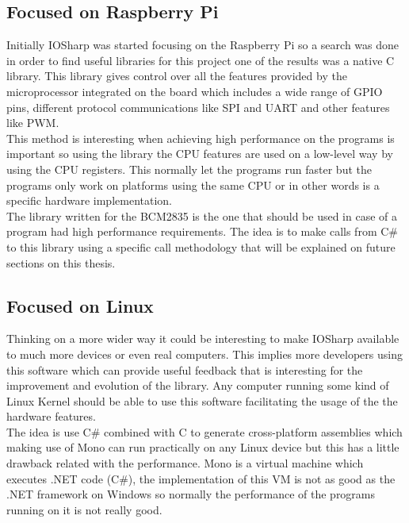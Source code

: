 \subsection{Focused on Raspberry Pi}\label{SS:IOSharp-RPI}
Initially IOSharp was started focusing on the Raspberry Pi so a search was done in order to find useful libraries for this project one of the results was a native C  library. This library gives control over all the features provided by the microprocessor integrated on the board which includes a wide range of \gls{GPIO} pins, different protocol communications like \gls{SPI} and \gls{UART} and other features like \gls{PWM}.
\\
This method is interesting when achieving high performance on the programs is important so using the library the CPU features are used on a low-level way by using the CPU registers. This normally let the programs run faster but the programs only work on platforms using the same CPU or in other words is a specific hardware implementation.
\\
The library written for the \gls{BCM2835} is the one that should be used in case of a program had high performance requirements. The idea is to make calls from C\# to this library using a specific call methodology that will be explained on future sections on this thesis.

\subsection{Focused on Linux}\label{SS:IOSharp-Linux}
Thinking on a more wider way it could be interesting to make IOSharp available to much more devices or even real computers. This implies more developers using this software which can provide useful feedback that is interesting for the improvement and evolution of the library. Any computer running some kind of Linux Kernel should be able to use this software facilitating the usage of the the hardware features.
\\
The idea is use C\# combined with C to generate cross-platform assemblies which making use of Mono can run practically on any Linux device but this has a little drawback related with the performance. Mono is a virtual machine which executes .NET code (C\#), the implementation of this VM is not as good as the .NET framework on Windows so normally the performance of the programs running on it is not really good.


